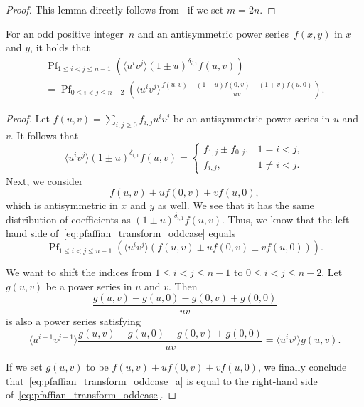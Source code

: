 \documentclass[ALCO, Unicode]{cedram}
\DeclareMathOperator*{\pf}{Pf}
\begin{document}
	\begin{proof}
		This lemma directly follows from~\cite[Theorem~14]{BFK23} if we set $m=2n$.
	\end{proof}
	
	\begin{lem}\label{thm:pfaffian_transform_oddcase}
		For an odd positive integer~$n$ and an antisymmetric power series~$f(x,y)$ in $x$ and $y$, it holds that
		\begin{multline}\label{eq:pfaffian_transform_oddcase}
			\pf_{1 \le i < j \le n-1} \left(\langle u^i v^j\rangle (1 \pm u)^{\delta_{i,1}} f(u,v) \right) \\
			= \pf_{0 \le i < j \le n-2} \left(\langle u^i v^j\rangle \frac{f(u,v) - (1 \mp u) f(0,v) - (1 \mp v) f(u,0)}{u v} \right).
		\end{multline}
	\end{lem}
	
	\begin{proof}
		Let $f(u,v) = \sum_{i,j \ge 0} f_{i,j} u^i v^j$ be an antisymmetric power series in $u$ and $v$. It follows that
		\begin{equation*}
			\langle u^i v^j \rangle (1 \pm u)^{\delta_{i,1}} f(u,v) =
			\begin{cases}
				f_{1,j} \pm f_{0,j}, & 1=i<j,\\
				f_{i,j}, & 1 \neq i<j.
			\end{cases}
		\end{equation*}
		Next, we consider
		\begin{equation*}
			f(u,v) \pm u f(0,v) \pm v f(u,0),
		\end{equation*}
		which is antisymmetric in $x$ and $y$ as well. We see that it has the same distribution of coefficients as $(1 \pm u)^{\delta_{i,1}} f(u,v)$. Thus, we know that the left-hand side of~\eqref{eq:pfaffian_transform_oddcase} equals
		\begin{equation}\label{eq:pfaffian_transform_oddcase_a}
			\pf_{1 \le i < j \le n-1} \left(\langle u^i v^j\rangle \left( f(u,v) \pm u f(0,v) \pm v f(u,0) \right) \right).
		\end{equation}
		
		We want to shift the indices from $1 \le i < j \le n-1$ to $0 \le i < j \le n-2$. Let $g(u,v)$ be a power series in $u$ and $v$. Then
		\begin{equation*}
			\frac{g(u,v)-g(u,0)-g(0,v)+g(0,0)}{u v}
		\end{equation*}
		is also a power series satisfying
		\begin{equation*}
			\langle u^{i-1} v^{j-1} \rangle \frac{g(u,v)-g(u,0)-g(0,v)+g(0,0)}{u v} = \langle u^i v^j \rangle g(u,v).
		\end{equation*}
		
		If we set $g(u,v)$ to be $f(u,v) \pm u f(0,v) \pm v f(u,0)$, we finally conclude that~\eqref{eq:pfaffian_transform_oddcase_a} is equal to the right-hand side of~\eqref{eq:pfaffian_transform_oddcase}. \qedhere	
	\end{proof}
	
\end{document}
